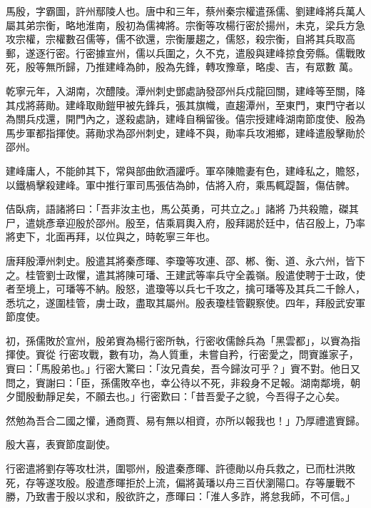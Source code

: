 
\begin{pinyinscope}

 馬殷，字霸圖，許州鄢陵人也。唐中和三年，蔡州秦宗權遣孫儒、劉建峰將兵萬人屬其弟宗衡，略地淮南，殷初為儒裨將。宗衡等攻楊行密於揚州，未克，梁兵方急攻宗權，宗權數召儒等，儒不欲還，宗衡屢趨之，儒怒，殺宗衡，自將其兵取高郵，遂逐行密。行密據宣州，儒以兵圍之，久不克，遣殷與建峰掠食旁縣。儒戰敗死，殷等無所歸，乃推建峰為帥，殷為先鋒，轉攻豫章，略虔、吉，有眾數
 萬。



 乾寧元年，入湖南，次醴陵。潭州刺史鄧處訥發邵州兵戍龍回關，建峰等至關，降其戍將蔣勛。建峰取勛鎧甲被先鋒兵，張其旗幟，直趨潭州，至東門，東門守者以為關兵戍還，開門內之，遂殺處訥，建峰自稱留後。僖宗授建峰湖南節度使、殷為馬步軍都指揮使。蔣勛求為邵州刺史，建峰不與，勛率兵攻湘鄉，建峰遣殷擊勛於邵州。



 建峰庸人，不能帥其下，常與部曲飲酒讙呼。軍卒陳贍妻有色，建峰私之，贍怒，以鐵楇擊殺建峰。軍中推行軍司馬張佶為帥，佶將入府，乘馬輒踶齧，傷佶髀。



 佶臥病，語諸將曰：「吾非汝主也，馬公英勇，可共立之。」諸將
 乃共殺贍，磔其尸，遣姚彥章迎殷於邵州。殷至，佶乘肩輿入府，殷拜謁於廷中，佶召殷上，乃率將吏下，北面再拜，以位與之，時乾寧三年也。



 唐拜殷潭州刺史。殷遣其將秦彥暉、李瓊等攻連、邵、郴、衡、道、永六州，皆下之。桂管劉士政懼，遣其將陳可璠、王建武等率兵守全義嶺。殷遣使聘于士政，使者至境上，可璠等不納。殷怒，遣瓊等以兵七千攻之，擒可璠等及其兵二千餘人，悉坑之，遂圍桂管，虜士政，盡取其屬州。殷表瓊桂管觀察使。四年，拜殷武安軍節度使。



 初，孫儒敗於宣州，殷弟賨為楊行密所執，行密收儒餘兵為「黑雲都」，以賨為指揮使。賨從
 行密攻戰，數有功，為人質重，未嘗自矜，行密愛之，問賨誰家子，賨曰：「馬殷弟也。」行密大驚曰：「汝兄貴矣，吾今歸汝可乎？」賨不對。他日又問之，賨謝曰：「臣，孫儒敗卒也，幸公待以不死，非殺身不足報。湖南鄰境，朝夕聞殷動靜足矣，不願去也。」行密歎曰：「昔吾愛子之貌，今吾得子之心矣。



 然勉為吾合二國之懽，通商賈、易有無以相資，亦所以報我也！」乃厚禮遣賨歸。



 殷大喜，表賨節度副使。



 行密遣將劉存等攻杜洪，圍鄂州，殷遣秦彥暉、許德勛以舟兵救之，已而杜洪敗死，存等遂攻殷。殷遣彥暉拒於上流，偏將黃璠以舟三百伏瀏陽口。存等屢戰不
 勝，乃致書于殷以求和，殷欲許之，彥暉曰：「淮人多詐，將怠我師，不可信。」




\end{pinyinscope}
